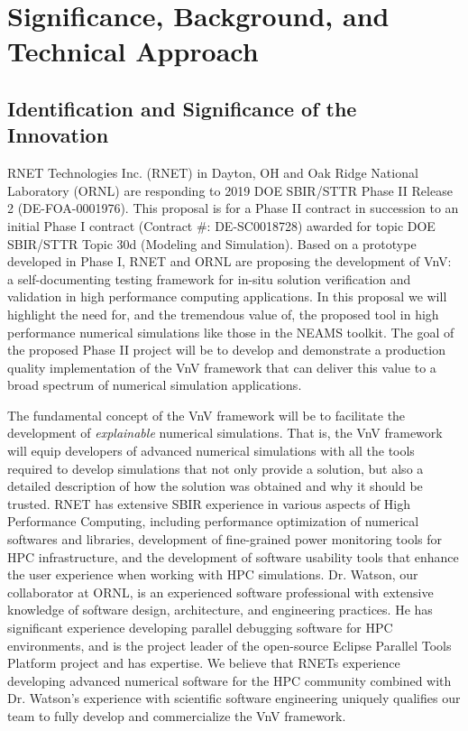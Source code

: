 \section{Significance, Background, and Technical Approach}

\subsection{Identification and Significance of the Innovation}
\label{sec:identification}

RNET Technologies Inc. (RNET) in Dayton, OH and Oak Ridge National Laboratory 
(ORNL) are responding to 2019 DOE SBIR/STTR Phase II Release 2 
(DE-FOA-0001976). This proposal is for a Phase II contract in succession to an 
initial Phase I contract (Contract \#: DE-SC0018728) awarded for topic DOE 
SBIR/STTR Topic 30d (Modeling and Simulation). Based on a prototype developed in Phase I, RNET and ORNL are proposing the development of VnV: a self-documenting 
testing framework for in-situ solution verification and validation in high performance computing applications. In this proposal we will highlight the need for, and the tremendous value of, the proposed tool in high performance numerical simulations like those in the NEAMS toolkit. The goal of the proposed Phase II project will be to develop and demonstrate a production quality implementation of the VnV framework that can deliver this value to a broad spectrum of numerical simulation applications. 

The fundamental concept of the VnV framework will be to facilitate the development of \emph{explainable} numerical simulations. That is, the VnV framework will equip developers of advanced numerical simulations with all the tools required to develop simulations that not only provide a solution, but also a detailed description of how the solution was obtained and why it should be trusted. RNET has extensive SBIR experience in various aspects of High Performance Computing, including performance optimization of numerical softwares and libraries, development of fine-grained power monitoring tools for HPC infrastructure, and the development of software usability tools that enhance the user experience when working with HPC simulations. Dr. Watson, our collaborator at ORNL, is an experienced software professional with extensive knowledge of software design, architecture, and engineering practices. He has significant experience developing parallel debugging software for HPC environments, and  is the project leader of the open-source Eclipse Parallel Tools Platform project and has expertise. We believe that RNETs experience developing advanced numerical software for the HPC community combined with Dr. Watson's experience with scientific software engineering uniquely qualifies our team to fully develop and commercialize the VnV framework.

